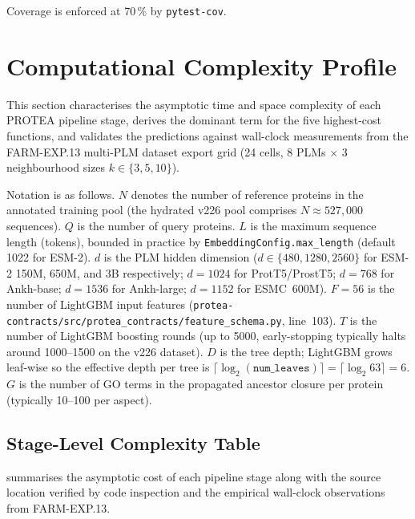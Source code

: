 Coverage is enforced at 70\,\% by \texttt{pytest-cov}.

\section{Computational Complexity Profile}
\label{sec:complexity}

This section characterises the asymptotic time and space complexity of each
PROTEA pipeline stage, derives the dominant term for the five highest-cost
functions, and validates the predictions against wall-clock measurements from
the FARM-EXP.13 multi-PLM dataset export grid (24 cells, 8 PLMs $\times$ 3
neighbourhood sizes $k \in \{3, 5, 10\}$).

Notation is as follows.
$N$ denotes the number of reference proteins in the annotated training pool
(the hydrated v226 pool comprises $N \approx 527{,}000$ sequences).
$Q$ is the number of query proteins.
$L$ is the maximum sequence length (tokens), bounded in practice by
\texttt{EmbeddingConfig.max\_length} (default 1022 for ESM-2).
$d$ is the PLM hidden dimension ($d \in \{480, 1280, 2560\}$ for ESM-2 150M,
650M, and 3B respectively; $d = 1024$ for ProtT5/ProstT5; $d = 768$ for
Ankh-base; $d = 1536$ for Ankh-large; $d = 1152$ for ESMC~600M).
$F = 56$ is the number of LightGBM input features
(\texttt{protea-contracts/src/protea\_contracts/feature\_schema.py}, line~103).
$T$ is the number of LightGBM boosting rounds (up to 5000, early-stopping
typically halts around 1000--1500 on the v226 dataset).
$D$ is the tree depth; LightGBM grows leaf-wise so the effective depth per
tree is $\lceil\log_2(\texttt{num\_leaves})\rceil = \lceil\log_2 63\rceil = 6$.
$G$ is the number of GO terms in the propagated ancestor closure per protein
(typically 10--100 per aspect).

\subsection{Stage-Level Complexity Table}
\label{subsec:complexity-table}

 summarises the asymptotic cost of each pipeline stage
along with the source location verified by code inspection and the empirical
wall-clock observations from FARM-EXP.13.

